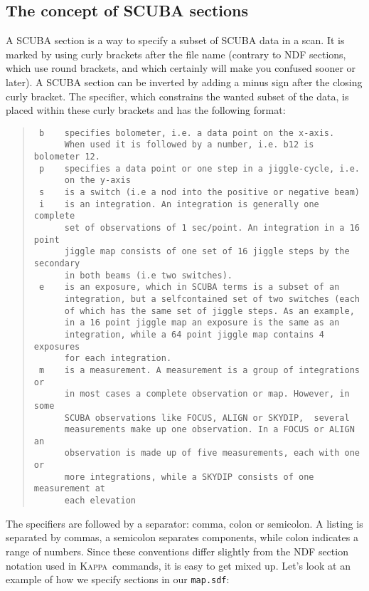 \documentclass[twoside,11pt]{article}
\newenvironment{myquote}{\begin{quote}\begin{small}}{\end{small}\end{quote}}
\newcommand{\Kappa}{\xref{\textsc{Kappa}}{sun95}{}}
\newcommand{\xref}[3]{#1}
\newcommand{\xlabel}[1]{}
\begin{document}
\subsection{\xlabel{the_concept_of_scuba_sections}\xlabel{sections}The concept of SCUBA sections\label{sections}}

A SCUBA section is a way to specify a subset of SCUBA data in a scan.  It is
marked by using curly brackets after the file name (contrary to \xref{NDF
sections}{sun33}{ndf_sections}, which use round brackets, and which certainly
will make you confused sooner or later). A SCUBA section can be inverted by
adding a minus sign after the closing curly bracket. The specifier, which
constrains the wanted subset of the data, is placed within these curly
brackets and has the following format:

\begin{myquote} \begin{verbatim}
 b    specifies bolometer, i.e. a data point on the x-axis.
      When used it is followed by a number, i.e. b12 is bolometer 12.
 p    specifies a data point or one step in a jiggle-cycle, i.e.
      on the y-axis
 s    is a switch (i.e a nod into the positive or negative beam)
 i    is an integration. An integration is generally one complete
      set of observations of 1 sec/point. An integration in a 16 point
      jiggle map consists of one set of 16 jiggle steps by the secondary
      in both beams (i.e two switches).
 e    is an exposure, which in SCUBA terms is a subset of an
      integration, but a selfcontained set of two switches (each
      of which has the same set of jiggle steps. As an example,
      in a 16 point jiggle map an exposure is the same as an
      integration, while a 64 point jiggle map contains 4 exposures
      for each integration.
 m    is a measurement. A measurement is a group of integrations or
      in most cases a complete observation or map. However, in some
      SCUBA observations like FOCUS, ALIGN or SKYDIP,  several
      measurements make up one observation. In a FOCUS or ALIGN an
      observation is made up of five measurements, each with one or
      more integrations, while a SKYDIP consists of one measurement at
      each elevation

\end{verbatim} \end{myquote}

The specifiers are followed by a separator: comma, colon or semicolon. A
listing is separated by commas, a semicolon separates components, while colon
indicates a range of numbers. Since these conventions differ slightly from the
\xref{NDF section}{sun33}{ndf_sections} notation used in \Kappa\ commands,
it is easy to get mixed up. Let's look at an example of how we specify
sections in our \texttt{map.sdf}:
\end{document}
